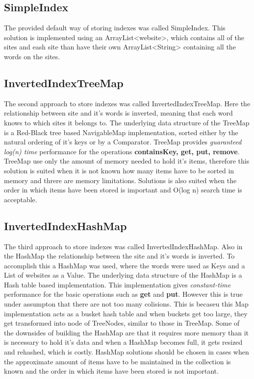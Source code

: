 \subsection{SimpleIndex}
The provided default way of storing indexes was called SimpleIndex. This solution is implemented using an ArrayList<website>, which contains all of the sites and eash site than have their own ArrayList<String>  containing all the words on the sites. \\

\subsection{InvertedIndexTreeMap}
The second approach to store indexes was called InvertedIndexTreeMap. Here the relationship between site and it's words is inverted, meaning that each word knows to which sites it belongs to. The underlying data structure of the TreeMap is a Red-Black tree based NavigableMap implementation, sorted either by the natural ordering of it's keys or by a Comparator. TreeMap provides \textit{guaranteed log(n) time} performance for the operations \textbf{containsKey, get, put, remove}.\cite{oracle:treemap} TreeMap use only the amount of memory needed to hold it's items, therefore this solution is suited when it is not known how many items have to be sorted in memory and threre are memory limitations. Solutions is also suited when the order in which items have been stored is important and O(log n) search time is acceptable. \cite{baeldung:HashTreeCompared} 

\subsection{InvertedIndexHashMap}
The third approach to store indexes was called InvertedIndexHashMap. Also in the HashMap the relationship between the site and it's words is inverted. To accomplish this a HashMap was used, where the words were used as Keys and  a List of websites as a Value. 
The underlying data structure of the HashMap is a Hash table based implementation. This implementation gives \textit{constant-time} performance for the basic operations such as \textbf{get} and \textbf{put}. \cite{oracle:hashmap} However this is true under assumpton that there are not too many colisions. This is becaseu this Map implementation acts as a busket hash table and when buckets get too large, they get transformed into node of TreeNodes, similar to those in TreeMap. \cite{baeldung:HashTreeCompared} Some of the downsides of building the HashMap are that it requires more memory than it is necessary to hold it's data and when a HashMap becomes full, it gets resized and rehashed, which is costly. HashMap solutions should be chosen in cases when the approximate amount of items have to be maintained in the collection is known and the order in which items have been stored is not important. \cite{baeldung:HashTreeCompared} 


